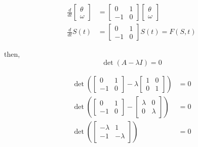 \documentclass[a4paper,11pt]{report}
\begin{document}
\begin{enumerate}
    \begin{equation*}
    \begin{aligned}
    \frac{d}{dt} \begin{bmatrix} \theta \\ \omega \end{bmatrix} &= 
    \begin{bmatrix} 0 & 1 \\ -1 & 0 \end{bmatrix} \begin{bmatrix} \theta \\ 
    \omega \end{bmatrix} \\
    \frac{d}{dt} S(t) &= \begin{bmatrix} 0 & 1 \\ -1 & 0 \end{bmatrix} S(t) 
    = F(S, t)
    \end{aligned}
    \end{equation*}

    then,
    \begin{equation*}
    \det \left( A - \lambda I \right) = 0
    \end{equation*}

    \begin{equation*}
    \begin{aligned}
    \det \left( \begin{bmatrix} 0 & 1 \\ -1 & 0 \end{bmatrix} - \lambda 
    \begin{bmatrix} 1 & 0 \\ 0 & 1 \end{bmatrix} \right) &= 0 \\
    \det \left( \begin{bmatrix} 0 & 1 \\ -1 & 0 \end{bmatrix} - 
    \begin{bmatrix} \lambda & 0 \\ 0 & \lambda \end{bmatrix} \right) &= 0 \\
    \det \left( \begin{bmatrix} - \lambda & 1 \\ -1 & - \lambda \end{bmatrix} 
    \right) &= 0
    \end{aligned}
    \end{equation*}


\end{enumerate}
\end{document}
